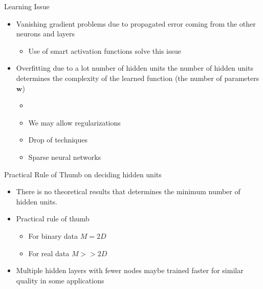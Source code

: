\documentclass[10pt, hyperref={colorlinks = true,linkcolor = blue}]{beamer}
\begin{document}
{{\begin{frame}{Learning Issue}
\begin{itemize}
\item  Vanishing gradient problems due to propagated error coming from the other neurons and layers
\begin{itemize}
\item Use of smart activation functions solve this issue 
\end{itemize}
\item Overfitting due to a lot number of hidden units the number of hidden units determines the complexity of the learned function (the number of parameters $\bm w$)
\begin{itemize}
\item 
\item We may allow regularizations 
\item Drop of techniques 
\item Sparse neural networks 
\end{itemize} 
\end{itemize}
\end{frame}


\begin{frame}{Practical Rule of Thumb on deciding hidden units}
\begin{itemize}
\item There is no theoretical results that determines the  minimum number of hidden units.
\item Practical rule of thumb 
\begin{itemize}
\item For binary data $M=2D$
\item For real data $M>>2D$ 
\end{itemize}
\item Multiple hidden layers with fewer nodes maybe trained faster for similar quality in some applications 
\end{itemize}
\end{frame}

}

}
\end{document}
